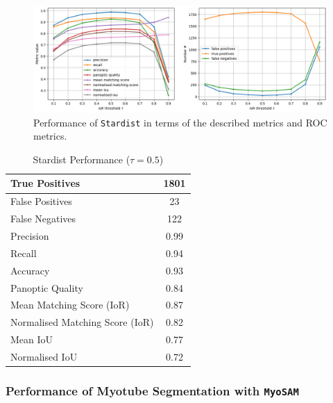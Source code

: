 \begin{figure}
	\centering
	\includegraphics[width=\textwidth]{"images/quantitative_performance_stardist.png"}
	\caption[Quantitative performance \texttt{Stardist}]{Performance of \texttt{Stardist} in terms of the described metrics and ROC metrics.}
	\label{figperfstardist}
\end{figure} 

\begin{table}[H]
	\centering
	\caption{Stardist Performance ($\tau = 0.5$)}
	\label{tabstardist}
	\begin{tabular}{|l|c|}
		\hline
		True Positives & 1801 \\
		\hline
		False Positives & 23 \\
		\hline
		False Negatives & 122 \\
		\hline
		Precision & 0.99 \\
		\hline
		Recall & 0.94 \\
		\hline
		Accuracy & 0.93 \\
		\hline
		Panoptic Quality & 0.84 \\
		\hline
		Mean Matching Score (IoR) & 0.87 \\
		\hline
		Normalised Matching Score (IoR) & 0.82 \\
		\hline
		Mean IoU & 0.77 \\
		\hline
		Normalised IoU & 0.72 \\
		\hline
	\end{tabular}
\end{table}

\subsubsection{Performance of Myotube Segmentation with \texttt{MyoSAM}}

